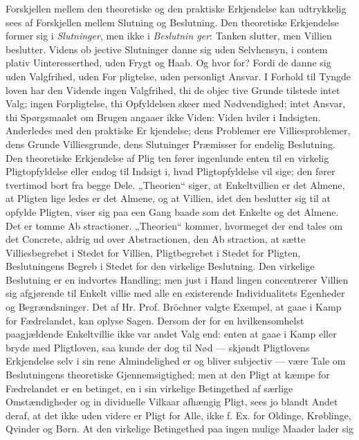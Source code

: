 \documentclass[12pt]{book}
\newcommand{\opage}[1]{\marginnote{\footnotesize\textit{[#1]}}}
\begin{document}
Forskjellen mellem den theoretiske og den praktiske
Erkjendelse kan udtrykkelig sees af Forskjellen mellem
Slutning og Beslutning. Den theoretiske Erkjendelse
former sig i \emph{Slutninger}, men ikke i \emph{Beslutnin\-%
ger}: Tanken slutter, men Villien beslutter. Videns ob\-%
jective Slutninger danne sig uden Selvhensyn, i contem\-%
plativ Uinteresserthed, uden Frygt og Haab. Og hvor\-%
for? Fordi de danne sig uden Valgfrihed, uden For\-%
pligtelse, uden personligt Ansvar. I Forhold til Tyngde\-%
loven har den Vidende ingen Valgfrihed, thi de objec\-%
tive Grunde tilstede intet Valg; ingen Forpligtelse, thi
\opage{34}\setcounter{footnote}{0}%
Opfyldelsen skeer med Nødvendighed; intet Ansvar, thi
Spørgsmaalet om Brugen angaaer ikke Viden: Viden
hviler i Indsigten. Anderledes med den praktiske Er\-%
kjendelse; dens Problemer ere Villiesproblemer, dens
Grunde Villiesgrunde, dens Slutninger Præmisser for
endelig Beslutning. Den theoretiske Erkjendelse af Plig\-%
ten fører ingenlunde enten til en virkelig Pligtopfyldelse
eller endog til Indsigt i, hvad Pligtopfyldelse vil sige;
den fører tvertimod bort fra begge Dele. „Theorien“
siger, at Enkeltvillien er det Almene, at Pligten lige\-%
ledes er det Almene, og at Villien, idet den beslutter
sig til at opfylde Pligten, viser sig paa een Gang baade
som det Enkelte og det Almene. Det er tomme Ab\-%
stractioner. „Theorien“ kommer, hvormeget der end tales
om det Concrete, aldrig ud over Abstractionen, den Ab\-%
straction, at sætte Villiesbegrebet i Stedet for Villien,
Pligtbegrebet i Stedet for Pligten, Beslutningens Begreb
i Stedet for den virkelige Beslutning. Den virkelige
Beslutning er en indvortes Handling; men just i Hand\-%
lingen concentrerer Villien sig afgjørende til Enkelt\-%
villie med alle en existerende Individualitets Egenheder
og Begrændsninger. Det af Hr. Prof. Bröchner valgte
Exempel, at gaae i Kamp for Fædrelandet, kan oplyse
Sagen. Dersom der for en hvilkensomhelst paagjældende
Enkeltvillie ikke var andet Valg end: enten at gaae i
Kamp eller bryde med Pligtloven, saa kunde der dog til
Nød --- skjøndt Pligtlovens Erkjendelse selv i sin rene
Almindelighed er og bliver subjectiv --- være Tale om
Beslutningens theoretiske Gjennemsigtighed; men at den
Pligt at kæmpe for Fædrelandet er en betinget, en i sin
virkelige Betingethed af særlige Omstændigheder og in\-%
dividuelle Vilkaar afhængig Pligt, sees jo blandt Andet
deraf, at det ikke uden videre er Pligt for Alle, ikke f. Ex.
for Oldinge, Krøblinge, Qvinder og Børn. At den
\opage{35}\setcounter{footnote}{0}%
virkelige Betingethed paa ingen mulige Maader lader sig
\end{document}

